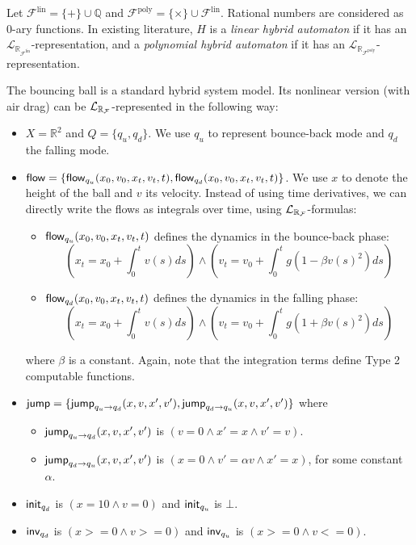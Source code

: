 \documentclass[12pt]{llncs}
\begin{document}
\begin{example} Let $\mathcal{F}^{\mathrm{lin}} = \{+\}\cup \mathbb{Q}$ and $\mathcal{F}^{\mathrm{poly}}=\{\times\}\cup\mathcal{F}^{\mathrm{lin}}$. Rational numbers are considered as 0-ary functions. In existing literature, $H$ is a {\em linear hybrid automaton} if it has an $\mathcal{L}_{\mathbb{R}_{\mathcal{F}^{\mathrm{lin}}}}$-representation, and a {\em polynomial hybrid automaton} if it has an $\mathcal{L}_{\mathbb{R}_{\mathcal{F}^{\mathrm{poly}}}}$-representation.
\end{example}

\begin{example}
The bouncing ball is a standard hybrid system model. Its nonlinear version (with air drag) can be $\mathcal{L}_{\mathbb{R}_{\mathcal{F}}}$-represented in the following way:
\begin{itemize}
\item $X = \mathbb{R}^2$ and $Q = \{q_u, q_d\}$. We use $q_u$ to represent bounce-back mode and $q_d$ the falling mode.
\item $\mathsf{flow} = \{\mathsf{flow}_{q_u}(x_0, v_0, x_t, v_t, t), \mathsf{flow}_{q_d}(x_0, v_0, x_t, v_t, t)\}$. We use $x$ to denote the height of the ball and $v$ its velocity. Instead of using time derivatives, we can directly write the flows as integrals over time, using $\mathcal{L}_{\mathbb{R}_{\mathcal{F}}}$-formulas:
\begin{itemize}
\item $\mathsf{flow}_{q_u}(x_0, v_0, x_t, v_t, t)$ defines the dynamics in the bounce-back phase:
$$(x_t = x_0 + \int_0^{t} v(s) ds) \wedge (v_t = v_0 + \int_0^t g(1-\beta v(s)^2) ds)$$
\item $\mathsf{flow}_{q_d}(x_0, v_0, x_t, v_t, t)$ defines the dynamics in the falling phase:
$$(x_t = x_0 + \int_0^{t} v(s) ds) \wedge (v_t = v_0 + \int_0^t g(1+\beta v(s)^2) ds)$$
\end{itemize}where
$\beta$ is a constant. Again, note that the integration terms define Type 2 computable functions.
\item $\mathsf{jump} = \{\mathsf{jump}_{q_u \rightarrow q_d} (x, v, x', v'), \mathsf{jump}_{q_d \rightarrow q_u} (x, v, x', v')\}$ where
\begin{itemize}
 \item $\mathsf{jump}_{q_u \rightarrow q_d} (x, v, x', v')$ is $(v= 0 \wedge x' = x \wedge v' = v)$.
\item $\mathsf{jump}_{q_d \rightarrow q_u} (x, v, x', v')$ is $(x= 0 \wedge v' = \alpha v\wedge x'=x)$,  for some constant $\alpha$.
\end{itemize}
\vspace{0.1cm}
\item $\mathsf{init}_{q_d}$ is $(x=10 \wedge v=0)$ and $\mathsf{init}_{q_u}$ is $\bot$.
\item $\mathsf{inv}_{q_d}$ is $(x>=0 \wedge v>=0)$ and $\mathsf{inv}_{q_u}$ is $(x>=0 \wedge v<=0)$.
\end{itemize}
\end{example}
\end{document}
